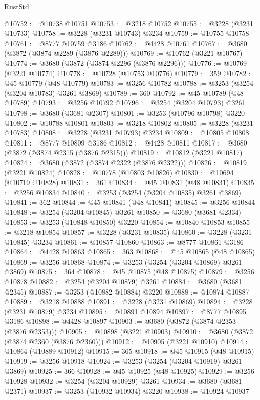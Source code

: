 \begin{lexlean}{RustStd}
\begin{coremodule}
{\begin{coremodule}
{{{{{{{{{{{{{{{{{{{{{{{{{{{{{{{{{{{{{@10752 := @10738 @10751
@10753 := @3218 @10752
@10755 := @3228 (@3231 @10733)
@10758 := @3228 (@3231 @10743) @3234
@10759 := @10755 @10758
@10761 := @8777 @10759 @3186
@10762 := @4428 @10761
@10767 := @3680 (@3872 (@3874 @2289 (@3876 @2289)))
@10769 := @10762 (@3221 @10767)
@10774 := @3680 (@3872 (@3874 @2296 (@3876 @2296)))
@10776 := @10769 (@3221 @10774)
@10778 := @10728 (@10753 @10776)
@10779 := 359
@10782 := @45 @10779 (@48 @10779)
@10783 := @3256 @10782
@10788 := @3253 (@3254 (@3204 @10783) @3261 @3869)
@10789 := 360
@10792 := @45 @10789 (@48 @10789)
@10793 := @3256 @10792
@10796 := @3254 (@3204 @10793) @3261
@10798 := @3680 (@3681 @2307)
@10801 := @3253 (@10796 @10798) @3220
@10802 := @10788 @10801
@10803 := @3218 @10802
@10805 := @3228 (@3231 @10783)
@10808 := @3228 (@3231 @10793) @3234
@10809 := @10805 @10808
@10811 := @8777 @10809 @3186
@10812 := @4428 @10811
@10817 := @3680 (@3872 (@3874 @2315 (@3876 @2315)))
@10819 := @10812 (@3221 @10817)
@10824 := @3680 (@3872 (@3874 @2322 (@3876 @2322)))
@10826 := @10819 (@3221 @10824)
@10828 := @10778 (@10803 @10826)
@10830 := @10694 (@10719 @10828)
@10831 := 361
@10834 := @45 @10831 (@48 @10831)
@10835 := @3256 @10834
@10840 := @3253 (@3254 (@3204 @10835) @3261 @3869)
@10841 := 362
@10844 := @45 @10841 (@48 @10841)
@10845 := @3256 @10844
@10848 := @3254 (@3204 @10845) @3261
@10850 := @3680 (@3681 @2334)
@10853 := @3253 (@10848 @10850) @3220
@10854 := @10840 @10853
@10855 := @3218 @10854
@10857 := @3228 (@3231 @10835)
@10860 := @3228 (@3231 @10845) @3234
@10861 := @10857 @10860
@10863 := @8777 @10861 @3186
@10864 := @4428 @10863
@10865 := 363
@10868 := @45 @10865 (@48 @10865)
@10869 := @3256 @10868
@10874 := @3253 (@3254 (@3204 @10869) @3261 @3869)
@10875 := 364
@10878 := @45 @10875 (@48 @10875)
@10879 := @3256 @10878
@10882 := @3254 (@3204 @10879) @3261
@10884 := @3680 (@3681 @2345)
@10887 := @3253 (@10882 @10884) @3220
@10888 := @10874 @10887
@10889 := @3218 @10888
@10891 := @3228 (@3231 @10869)
@10894 := @3228 (@3231 @10879) @3234
@10895 := @10891 @10894
@10897 := @8777 @10895 @3186
@10898 := @4428 @10897
@10903 := @3680 (@3872 (@3874 @2353 (@3876 @2353)))
@10905 := @10898 (@3221 @10903)
@10910 := @3680 (@3872 (@3874 @2360 (@3876 @2360)))
@10912 := @10905 (@3221 @10910)
@10914 := @10864 (@10889 @10912)
@10915 := 365
@10918 := @45 @10915 (@48 @10915)
@10919 := @3256 @10918
@10924 := @3253 (@3254 (@3204 @10919) @3261 @3869)
@10925 := 366
@10928 := @45 @10925 (@48 @10925)
@10929 := @3256 @10928
@10932 := @3254 (@3204 @10929) @3261
@10934 := @3680 (@3681 @2371)
@10937 := @3253 (@10932 @10934) @3220
@10938 := @10924 @10937
}}}}}}}}}}}}}}}}}}}}}}}}}}}}}}}}}}}}}
\end{coremodule}}
\end{coremodule}
\end{lexlean}
